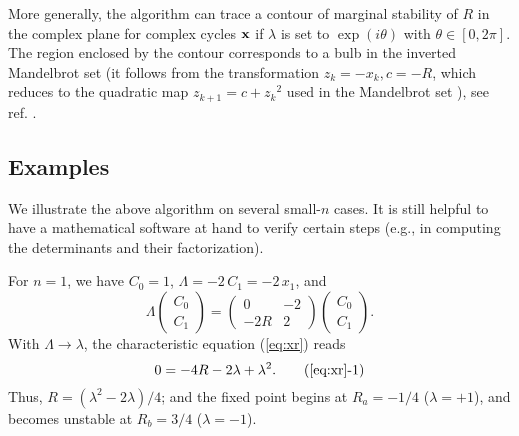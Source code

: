 \documentclass{ws-ijbc}
\begin{document}
More generally, the algorithm can trace a contour of marginal stability of $R$
  in the complex plane
  for complex cycles $\mathbf{x}$
  if $\lambda$ is set to $\exp(i\theta)$ with $\theta \in [0, 2\pi]$.
  The region enclosed by the contour corresponds to
    a bulb in the inverted Mandelbrot set
  (it follows from the transformation $z_k = -x_k, c = -R$, which
  reduces  to the quadratic map $z_{k+1} = c + {z_k}^2$
  used in the Mandelbrot set \cite{mandelbrot}),
  see ref. \cite{stephenson2, stephenson3}. %







\subsection{\label{sec:examples}Examples}




We illustrate the above algorithm on several small-$n$ cases.
%
It is still helpful to have a mathematical software
  at hand to verify certain steps
  (e.g., in computing the determinants and their factorization).



For $n = 1$, we have
  $C_0 = 1$, $\Lambda = -2 \, C_1 = -2 \, x_1$, and
\[
  \Lambda
  \left( \begin{array}{c}
  C_0 \\
  C_1
  \end{array} \right)
  =
  \left( \begin{array}{cc}
  0     & -2 \\
  -2R   &  2
  \end{array}\right)
  \left( \begin{array}{c}
  C_0 \\
  C_1
  \end{array} \right).
\]
With $\Lambda \rightarrow \lambda$, the characteristic equation (\ref{eq:xr}) reads
\begin{equation}
0
  = -4R - 2\lambda + \lambda^2.
  \tag{\ref{eq:xr}-1}
\label{eq:xr1}
\end{equation}
Thus, $R = (\lambda^2 -2\lambda)/4$;
  and the fixed point begins at $R_a = -1/4$ ($\lambda = +1$), and
  becomes unstable at $R_b = 3/4$ ($\lambda = -1$).
\end{document}
